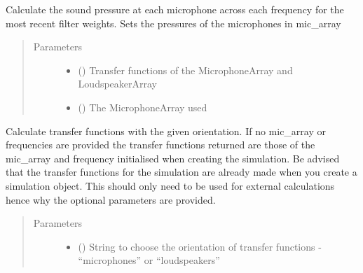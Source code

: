 \documentclass[letterpaper,10pt,english]{sphinxmanual}
\begin{document}
\begin{fulllineitems}
\begin{fulllineitems}
\label{\detokenize{source/pyzones:pyzones.Simulation.calculate_sound_pressures}}
Calculate the sound pressure at each microphone across each frequency for the most recent filter weights. Sets
the pressures of the microphones in mic\_array
\begin{quote}\begin{description}
\item[{Parameters}] \leavevmode\begin{itemize}
\item {} 
 () \textendash{} Transfer functions of the MicrophoneArray and LoudspeakerArray

\item {} 
 ({\hyperref[\detokenize{source/pyzones:pyzones.MicrophoneArray}]{}}) \textendash{} The MicrophoneArray used

\end{itemize}

\end{description}\end{quote}

\end{fulllineitems}


\begin{fulllineitems}
\label{\detokenize{source/pyzones:pyzones.Simulation.calculate_transfer_functions}}
Calculate transfer functions with the given orientation. If no mic\_array or frequencies are provided the
transfer functions returned are those of the mic\_array and frequency initialised when creating the simulation.
Be advised that the transfer functions for the simulation are already made when you create a simulation object.
This should only need to be used for external calculations hence why the optional parameters are provided.
\begin{quote}\begin{description}
\item[{Parameters}] \leavevmode\begin{itemize}
\item {} 
 () \textendash{} String to choose the orientation of transfer functions - “microphones” or “loudspeakers”


\end{itemize}
\end{description}
\end{quote}
\end{fulllineitems}
\end{fulllineitems}
\end{document}
